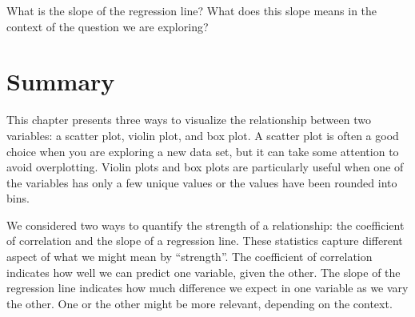 \documentclass[
]{book}
\begin{document}
What is the slope of the regression line? What does this slope means in
the context of the question we are exploring?

\section{Summary}\label{summary}

This chapter presents three ways to visualize the relationship between
two variables: a scatter plot, violin plot, and box plot. A scatter plot
is often a good choice when you are exploring a new data set, but it can
take some attention to avoid overplotting. Violin plots and box plots
are particularly useful when one of the variables has only a few unique
values or the values have been rounded into bins.

We considered two ways to quantify the strength of a relationship: the
coefficient of correlation and the slope of a regression line. These
statistics capture different aspect of what we might mean by
``strength''. The coefficient of correlation indicates how well we can
predict one variable, given the other. The slope of the regression line
indicates how much difference we expect in one variable as we vary the
other. One or the other might be more relevant, depending on the
context.

\backmatter
\end{document}
